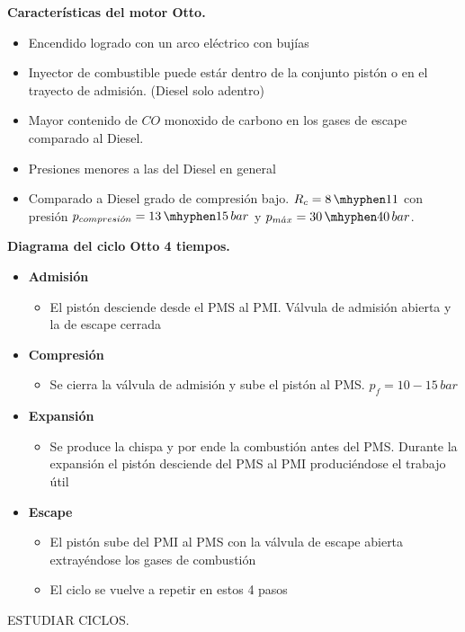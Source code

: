 \textbf{Características del motor Otto.}
\begin{itemize}
\item Encendido logrado con un arco eléctrico con bujías
\item Inyector de combustible puede estár dentro de la conjunto pistón o en el trayecto de admisión. (Diesel solo adentro)
\item Mayor contenido de $CO$ monoxido de carbono en los gases de escape comparado al Diesel.
\item Presiones menores a las del Diesel en general
\item Comparado a Diesel grado de compresión bajo. $\rc = 8\,\mhyphen 11$ con presión $p_{compresi\acute{o}n}=13\,\mhyphen15\, bar$ y $p_\max=30\,\mhyphen40\,bar$.
\end{itemize}
{\bf Diagrama del ciclo Otto 4 tiempos.}
\begin{itemize}
    \item {\bf Admisión}
    \begin{itemize}
        \item El pistón desciende desde el PMS al PMI. Válvula de admisión abierta y la de escape cerrada
    \end{itemize}
    \item \textbf{Compresión}
    \begin{itemize}
        \item Se cierra la válvula de admisión y sube el pistón al PMS. $p_f=10-15\,bar$
    \end{itemize}
    \item  \textbf{Expansión}
    \begin{itemize}
        \item Se produce la chispa y por ende la combustión antes del PMS. Durante la expansión el pistón desciende del PMS al PMI produciéndose el trabajo útil
    \end{itemize}
    \item \textbf{Escape}
    \begin{itemize}
        \item El pistón sube del PMI al PMS con la válvula de escape abierta extrayéndose los gases de combustión
        \item El ciclo se vuelve a repetir en estos 4 pasos
    \end{itemize}
\end{itemize}

ESTUDIAR CICLOS.


